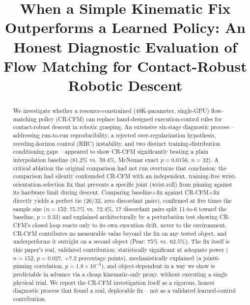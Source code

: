 \documentclass[]{interact}
\begin{document}
\title{When a Simple Kinematic Fix Outperforms a Learned Policy: An Honest Diagnostic Evaluation of Flow Matching for Contact-Robust Robotic Descent}

\author{
}

\maketitle

\begin{abstract}
We investigate whether a resource-constrained (49K-parameter, single-GPU) flow-matching policy
(CR-CFM) can replace hand-designed execution-control rules for contact-robust descent in robotic
grasping. An extensive six-stage diagnostic process -- addressing run-to-run reproducibility, a
rejected over-regularization hypothesis, receding-horizon control (RHC) instability, and two
distinct training-distribution conditioning gaps -- appeared to show CR-CFM significantly beating a
plain interpolation baseline (81.2\% vs.\ 59.4\%, McNemar exact $p=0.0156$, $n=32$). A critical
ablation the original comparison had not run overturns that conclusion: the comparison had silently
confounded CR-CFM with an independent, training-free wrist-orientation-selection fix that prevents a
specific joint (wrist-roll) from pinning against its hardware limit during descent. Comparing
baseline+fix against CR-CFM+fix directly yields a perfect tie ($26/32$, zero discordant pairs),
confirmed at five times the sample size ($n=152$: $75.7\%$ vs.\ $72.4\%$, 17 discordant pairs split
11-to-6 toward the baseline, $p=0.33$) and explained architecturally by a perturbation test showing
CR-CFM's closed loop reacts only to its own execution drift, never to the environment. CR-CFM
contributes no measurable value beyond the fix on any tested object, and underperforms it outright
on a second object (Pear: $75\%$ vs.\ $62.5\%$). The fix itself is this paper's real, validated
contribution: statistically significant at adequate power ($n=152$, $p=0.027$, $+7.2$ percentage
points), mechanistically explained (a joint6-pinning correlation, $p=1.8\times10^{-5}$), and
object-dependent in a way we show is predictable in advance via a cheap kinematic-only proxy,
without executing a single physical trial. We report the CR-CFM investigation itself as a rigorous,
honest diagnostic process that found a real, deployable fix -- not as a validated learned-control
contribution.
\end{abstract}
\end{document}
